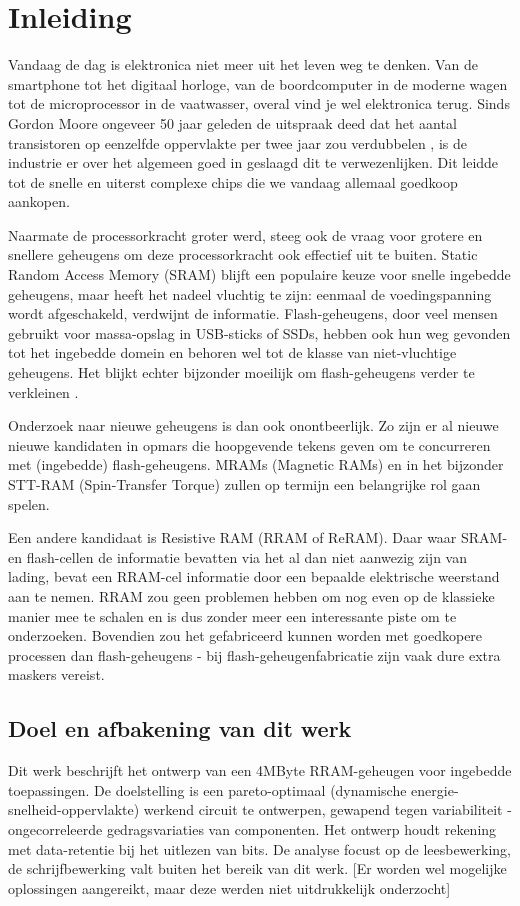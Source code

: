 \chapter{Inleiding}
\label{inleiding}

Vandaag de dag is elektronica niet meer uit het leven weg te denken. Van de smartphone tot het digitaal horloge, van de boordcomputer in de moderne wagen tot de microprocessor in de vaatwasser, overal vind je wel elektronica terug.
Sinds Gordon Moore ongeveer 50 jaar geleden de uitspraak deed dat het aantal transistoren op eenzelfde oppervlakte per twee jaar zou verdubbelen \cite{Moo65}, is de industrie er over het algemeen goed in geslaagd dit te verwezenlijken. Dit leidde tot de snelle en uiterst complexe chips die we vandaag allemaal goedkoop aankopen.

Naarmate de processorkracht groter werd, steeg ook de vraag voor grotere en snellere geheugens om deze processorkracht ook effectief uit te buiten. Static Random Access Memory (SRAM) blijft een populaire keuze voor snelle ingebedde geheugens, maar heeft het nadeel vluchtig te zijn: eenmaal de voedingspanning wordt afgeschakeld, verdwijnt de informatie. Flash-geheugens, door veel mensen gebruikt voor massa-opslag in USB-sticks of SSDs, hebben ook hun weg gevonden tot het ingebedde domein en behoren wel tot de klasse van niet-vluchtige geheugens.
Het blijkt echter bijzonder moeilijk om flash-geheugens verder te verkleinen \cite{Pra10}.

Onderzoek naar nieuwe geheugens is dan ook onontbeerlijk. Zo zijn er al nieuwe nieuwe kandidaten in opmars die hoopgevende tekens geven om te concurreren met (ingebedde) flash-geheugens. MRAMs (Magnetic RAMs) en in het bijzonder STT-RAM (Spin-Transfer Torque) zullen op termijn een belangrijke rol gaan spelen.

Een andere kandidaat is Resistive RAM (RRAM of ReRAM). Daar waar SRAM- en flash-cellen de informatie bevatten via het al dan niet aanwezig zijn van lading, bevat een RRAM-cel informatie door een bepaalde elektrische weerstand aan te nemen. RRAM zou geen problemen hebben om nog even op de klassieke manier mee te schalen en is dus zonder meer een interessante piste om te onderzoeken. Bovendien zou het gefabriceerd kunnen worden met goedkopere processen dan flash-geheugens - bij flash-geheugenfabricatie zijn vaak dure extra maskers vereist.

\section{Doel en afbakening van dit werk}
Dit werk beschrijft het ontwerp van een 4MByte RRAM-geheugen voor ingebedde toepassingen. De doelstelling is een pareto-optimaal (dynamische energie-snelheid-oppervlakte) werkend circuit te ontwerpen, gewapend tegen variabiliteit - ongecorreleerde gedragsvariaties van componenten. Het ontwerp houdt rekening met data-retentie bij het uitlezen van bits. De analyse focust op de leesbewerking, de schrijfbewerking valt buiten het bereik van dit werk. [Er worden wel mogelijke oplossingen aangereikt, maar deze werden niet uitdrukkelijk onderzocht]

